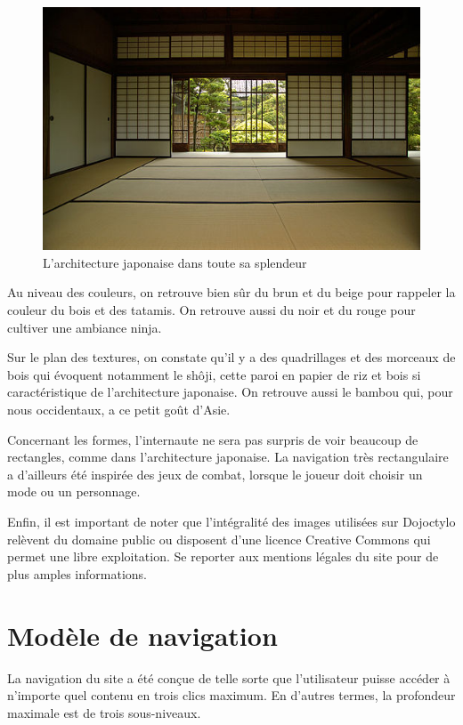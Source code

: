 \documentclass[a4paper,12pt]{article}
\begin{document}
\begin{figure}[!h]
\begin{center}
\includegraphics[width=\textwidth]{dojo.jpg}
\end{center}
\caption{L'architecture japonaise dans toute sa splendeur}
\end{figure}

Au niveau des couleurs, on retrouve bien sûr du brun et du beige pour rappeler la couleur du bois et des tatamis. On retrouve aussi du noir et du rouge pour cultiver une ambiance ninja.

Sur le plan des textures, on constate qu'il y a des quadrillages et des morceaux de bois qui évoquent notamment le shôji, cette paroi en papier de riz et bois si caractéristique de l'architecture japonaise. On retrouve aussi le bambou qui, pour nous occidentaux, a ce petit goût d'Asie.

Concernant les formes, l'internaute ne sera pas surpris de voir beaucoup de rectangles, comme dans l'architecture japonaise. La navigation très rectangulaire a d'ailleurs été inspirée des jeux de combat, lorsque le joueur doit choisir un mode ou un personnage.

Enfin, il est important de noter que l'intégralité des images utilisées sur Dojoctylo relèvent du domaine public ou disposent d'une licence Creative Commons qui permet une libre exploitation. Se reporter aux mentions légales du site pour de plus amples informations.

\section{Modèle de navigation}

La navigation du site a été conçue de telle sorte que l'utilisateur puisse accéder à n'importe quel contenu en trois clics maximum. En d'autres termes, la profondeur maximale est de trois sous-niveaux.
\end{document}

